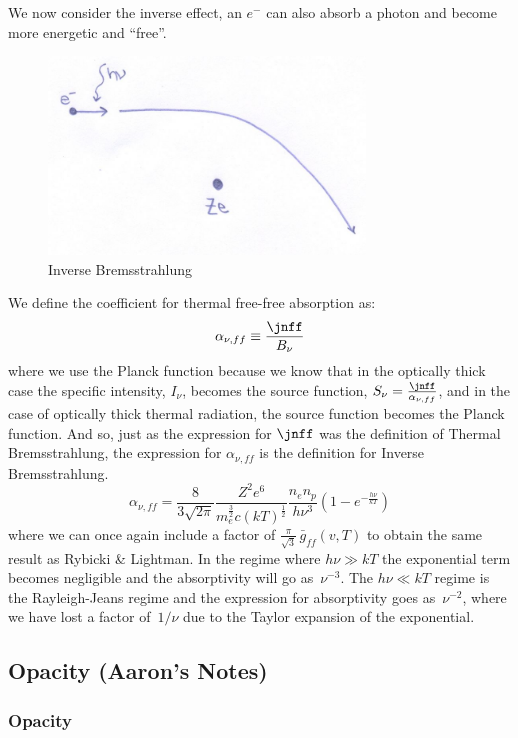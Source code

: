 \documentclass{article}
\def\hf{\frac12}
\def\hf{\frac12}
\begin{document}
We now consider the inverse effect, an $e^-$ can also absorb a photon and become more energetic and ``free''.  
\begin{figure}
    \centering
    \includegraphics[width=0.75\textwidth]{figures/800px-InvBremsstrahlung.jpg}
    \caption{Inverse Bremsstrahlung}
    \label{fig:inBremsstrahlung}
\end{figure}
We define the coefficient for thermal free-free absorption as:
\def\anff{\alpha_{\nu,ff}}
$$\anff\equiv\frac{\jnff}{ B_{\nu}}$$
where we use the Planck function because we know that in the optically thick case the specific intensity, $I_{\nu}$, becomes the source function, $S_{\nu}=\frac{\jnff}{ \anff}$, and in the case of optically thick thermal radiation, the source function becomes the Planck function. And so, just as the expression for $\jnff$ was the definition of Thermal Bremsstrahlung, the expression for $\anff$ is the definition for Inverse Bremsstrahlung. 
$$\boxed{\anff=\frac{8}{3\sqrt{2\pi}}\frac{Z^2e^6}{ m_e^\frac{3}{2}c(kT)^\hf}\frac{n_en_p}{ h\nu^3}\left({1-e^{-\frac{h\nu}{ kT}}}\right)}$$
where we can once again include a factor of $\frac{\pi}{\sqrt{3}}\,\bar{g}_{ff}(v,T)$ to obtain the same result as Rybicki \&
Lightman. In the regime where $h\nu\gg kT$ the exponential term becomes negligible and the absorptivity will go as $\,\nu^{-3}$. The $h\nu\ll kT$ regime is the Rayleigh-Jeans regime and the expression for absorptivity goes as $\,\nu^{-2}$, where we have lost a factor of ${\,1/\nu}$ due to the Taylor expansion of the exponential.

\subsection{Opacity (Aaron's Notes)}

\subsubsection{Opacity}
\end{document}
